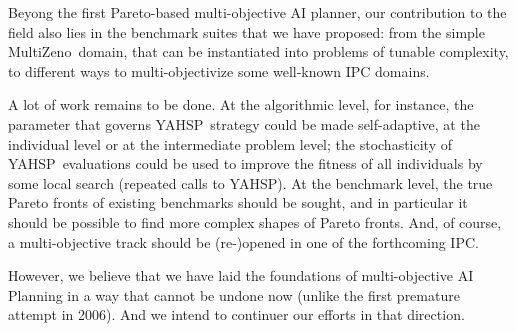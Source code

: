 \documentclass[english]{DESCARWINreport}
\newcounter{con}
\def\YAHSP{{\sc YAHSP}}
\def\MULTIZENO{{\sc MultiZeno}}
\begin{document}
Beyong the first Pareto-based multi-objective AI planner, our contribution to the field also lies in the benchmark suites that we have proposed: from the simple \MULTIZENO\ domain, that can be instantiated into problems of tunable complexity, to different ways to multi-objectivize some well-known IPC domains. 

A lot of work remains to be done. At the algorithmic level, for instance, the parameter that governs \YAHSP\ strategy could be made self-adaptive, at the individual level or at the intermediate problem level; the stochasticity of \YAHSP\ evaluations could be used to improve the fitness of all individuals by some local search (repeated calls to \YAHSP). At the benchmark level, the true Pareto fronts of existing benchmarks should be sought, and in particular it should be possible to find more complex shapes of Pareto fronts. And, of course, a multi-objective track should be (re-)opened in one of the forthcoming IPC.

However, we believe that we have laid the foundations of multi-objective AI Planning in a way that cannot be undone now (unlike the first premature attempt in 2006). And we intend to continuer our efforts in that direction.
\end{document}

